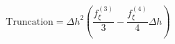 \begin{equation} 
\text{Truncation} = {\Delta h}^{2} \left(\frac{f^{{(3)}}_{{\xi}}}{3} - \frac{f^{{(4)}}_{{\xi}}}{4} {\Delta h}\right)
 \end{equation}